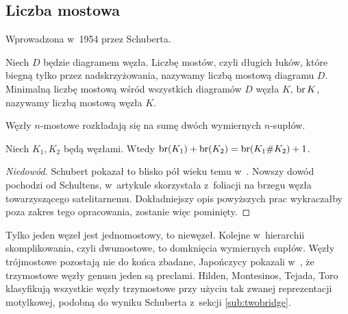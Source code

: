 
\subsection{Liczba mostowa}
%

Wprowadzona w~1954 przez Schuberta.
%

\begin{definition}
    Niech $D$ będzie diagramem węzła.
    Liczbę mostów, czyli długich łuków, które biegną tylko przez nadskrzyżowania, nazywamy liczbą mostową diagramu $D$.
    Minimalną liczbę mostową wśród wszystkich diagramów $D$ węzła $K$, $\operatorname{br} K$, nazywamy liczbą mostową węzła $K$.
\end{definition}

Węzły $n$-mostowe rozkładają się na sumę dwóch wymiernych $n$-supłów.
%

\begin{proposition}
\label{prp:bridge_additive}%
    Niech $K_1, K_2$ będą węzłami.
    Wtedy $\operatorname{br} (K_1) + \operatorname{br}(K_2) = \operatorname{br}(K_1 \# K_2) + 1$.
\end{proposition}

\begin{proof}[Niedowód]
%
%
    Schubert pokazał to blisko pół wieku temu w~\cite{schubert54}.
    Nowszy dowód pochodzi od Schultens, w~artykule \cite{schultens03} skorzystała z~foliacji na brzegu węzła towarzyszącego satelitarnemu.
    Dokładniejszy opis powyższych prac wykraczałby poza zakres tego opracowania, zostanie więc pominięty.
\end{proof}

Tylko jeden węzeł jest jednomostowy, to niewęzeł.
Kolejne w~hierarchii skomplikowania, czyli dwumostowe, to domknięcia wymiernych supłów.
Węzły trójmostowe pozostają nie do końca zbadane, Japończycy pokazali w~\cite{fukuhama99}, że trzymostowe węzły genusu jeden są preclami.
%
%
%
%
%
%
Hilden, Montesinos, Tejada, Toro \cite{hilden12} klasyfikują wszystkie węzły trzymostowe przy użyciu tak zwanej reprezentacji motylkowej, podobną do wyniku Schuberta z~sekcji \ref{sub:twobridge}.
%
%
%
%
%
%
%

